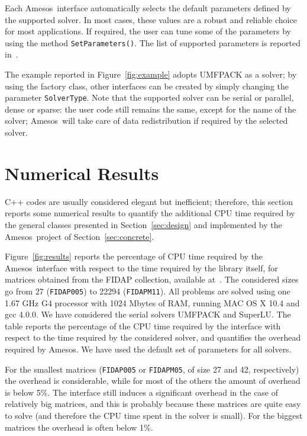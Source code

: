 \documentclass[acmtocl]{acmtrans2m}
\newcommand{\amesos}{{\sc Amesos}}
\begin{document}
Each \amesos\ interface automatically selects the default parameters defined by
the supported solver. In most cases, these values are a robust and reliable
choice for most applications. If required, the user can tune some of the
parameters by using the method \verb!SetParameters()!. The list of supported
parameters is reported in~\cite{Amesos-Reference-Guide}.

The example reported in Figure~\ref{fig:example} adopts UMFPACK as a solver; 
by using the factory class, other
interfaces can be created by simply changing the parameter
{\tt SolverType}. Note that the supported solver can be serial or parallel,
  dense or sparse: the user code still remains the same, except for the name
  of the solver;
  \amesos\ will take care of data redistribution if required by the selected
  solver. 

\section{Numerical Results}
\label{sec:numerical}

C++ codes are usually considered elegant but inefficient; therefore, this
section reports some numerical results to quantify the additional CPU time
required by the general classes presented in Section~\ref{sec:design} and
implemented by the \amesos\ project of Section~\ref{sec:concrete}.

Figure~\ref{fig:results} reports the percentage of CPU time required by the
\amesos\ interface with respect to the time required by the library itself, 
  for matrices obtained from the FIDAP collection, available
at~\cite{boisvert97matrix}. The considered sizes go from 27 
({\tt FIDAP005}) to 22294 ({\tt FIDAPM11}). All problems are solved using one
1.67 GHz G4 processor with 1024 Mbytes of RAM, running MAC OS X 10.4 and gcc
4.0.0. We have considered the serial solvers UMFPACK and
SuperLU. The table reports the percentage of the CPU time required by the
interface with respect to the time required by the considered solver, and
quantifies the overhead required by \amesos. We have used the default set of
parameters for all solvers.

For the smallest matrices (\verb!FIDAP005! or \verb!FIDAPM05!, of size
27 and 42, respectively)
the overhead is considerable, while for most of the others the amount of
overhead is below 5\%. The interface still induces a significant overhead in
the case of
relatively big matrices, and this is probably because these matrices are quite
easy to solve (and therefore the CPU time spent in the solver is small).
For the biggest matrices the overhead is often below 1\%.
\end{document}
